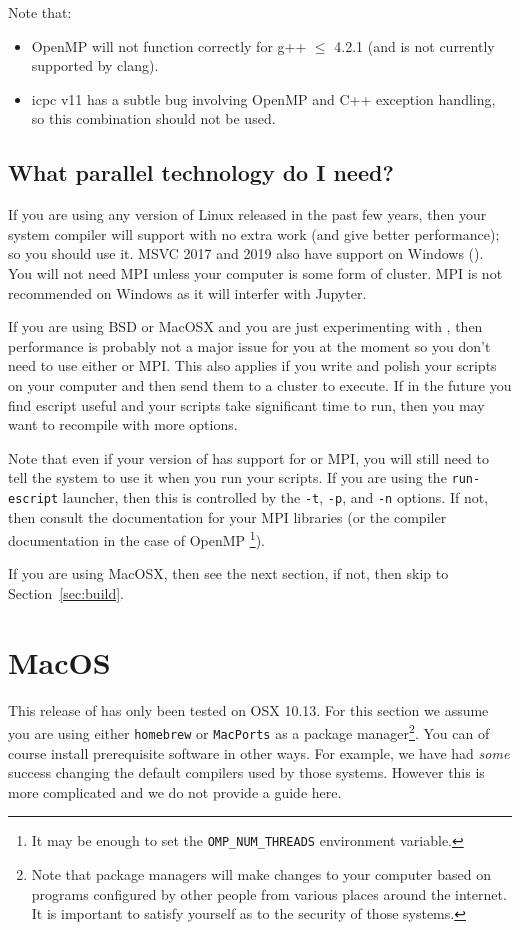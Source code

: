 Note that:
\begin{itemize}
 \item OpenMP will not function correctly for g++ $\leq$ 4.2.1 (and is not currently supported by clang).
 \item icpc v11 has a subtle bug involving OpenMP and C++ exception handling, so this combination should not be used.
\end{itemize}

\subsection{What parallel technology do I need?}\label{sec:needpar} If you are
using any version of Linux released in the past few years, then your system
compiler will support \openmp with no extra work (and give better performance);
so you should use it. MSVC 2017 and 2019 also have \openmp support on Windows
(). You will not need MPI unless your computer is some form of
cluster. MPI is not recommended on Windows as it will interfer with Jupyter.

If you are using BSD or MacOSX and you are just experimenting with \escript, then performance is
probably not a major issue for you at the moment so you don't need to use either \openmp or MPI. 
This also applies if you write and polish your scripts on your computer and then send them to a cluster to execute.
If in the future you find escript useful and your scripts take significant time to run, then you may want to recompile 
\escript with more options.



Note that even if your version of \escript has support for \openmp or MPI, you will still need to tell the system to 
use it when you run your scripts.
If you are using the \texttt{run-escript} launcher, then this is controlled by
the \texttt{-t}, \texttt{-p}, and \texttt{-n} options.
If not, then consult the documentation for your MPI libraries (or the compiler documentation in the case of OpenMP
\footnote{It may be enough to set the \texttt{OMP\_NUM\_THREADS} environment variable.}).

If you are using MacOSX, then see the next section, if not, then skip to Section~\ref{sec:build}.

\section{MacOS}
This release of \escript has only been tested on OSX 10.13.
For this section we assume you are using either \texttt{homebrew} or \texttt{MacPorts} as a package 
manager\footnote{Note that package managers will make changes to your computer based on programs configured by other people from 
various places around the internet. It is important to satisfy yourself as to the security of those systems.}.
You can of course install prerequisite software in other ways.
For example, we have had \emph{some} success changing the default 
compilers used by those systems. However this is more complicated and we do not provide a guide here.

